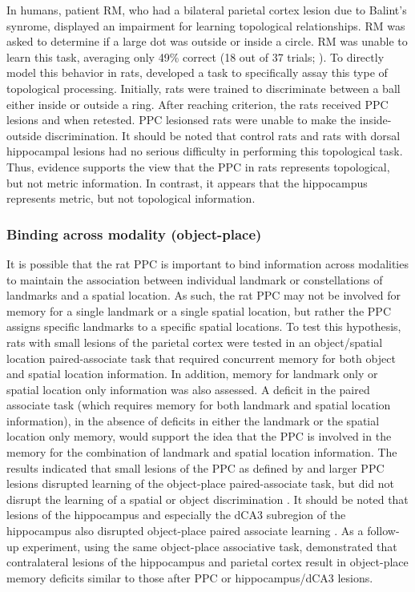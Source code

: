 \documentclass[doc, longtable]{apa6}
\begin{document}
In humans, patient RM, who had a bilateral parietal cortex lesion due to Balint's synrome, displayed an impairment for learning topological relationships. RM was asked to determine if a large dot was outside or inside a circle. RM was unable to learn this task, averaging only 49\% correct (18 out of 37 trials; \cite{Robertson1997a}). To directly model this behavior in rats, \cite{Goodrich-Hunsaker2008b} developed a task to specifically assay this type of topological processing. Initially, rats were trained to discriminate between a ball either inside or outside a ring. After reaching criterion, the rats received PPC lesions and when retested. PPC lesionsed rats were unable to make the inside-outside discrimination. It should be noted that control rats and rats with dorsal hippocampal lesions had no serious difficulty in performing this topological task.  Thus, evidence supports the view that the PPC in rats represents topological, but not metric information. In contrast, it appears that the hippocampus represents metric, but not topological information.

\subsubsection{Binding across modality (object-place)}
It is possible that the rat PPC is important to bind information across modalities to maintain the association between individual landmark or constellations of landmarks and a spatial location. As such, the rat PPC may not be involved for memory for a single landmark or a single spatial location, but rather the PPC assigns specific landmarks to a specific spatial locations. To test this hypothesis, rats with small lesions of the parietal cortex were tested in an object/spatial location paired-associate task that required concurrent memory for both object and spatial location information. In addition, memory for landmark only or spatial location only information was also assessed. A deficit in the paired associate task (which requires memory for both landmark and spatial location information), in the absence of deficits in either the landmark or the spatial location only memory, would support the idea that the PPC is involved in the memory for the combination of landmark and spatial location information. The results indicated that small lesions of the PPC as defined by \textcite{Reep1994a} and larger PPC lesions disrupted learning of the object-place paired-associate task, but did not disrupt the learning of a spatial or object discrimination \parencite{Long1998b, Long1998}. It should be noted that lesions of the hippocampus and especially the dCA3 subregion of the hippocampus also disrupted object-place paired associate learning \parencite{Gilbert2003b}. As a follow-up experiment, using the same object-place associative task, \parencite{Rogers2007a} demonstrated that contralateral lesions of the hippocampus and parietal cortex result in object-place memory deficits similar to those after PPC or hippocampus/dCA3 lesions.
	
\end{document}
